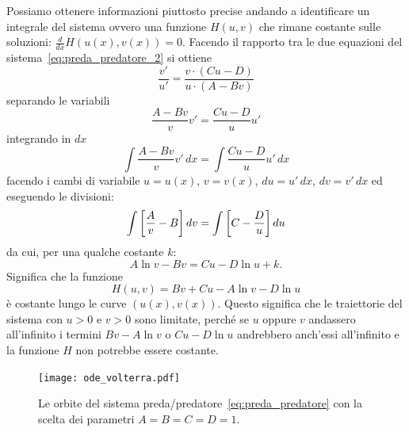 Possiamo ottenere informazioni piuttosto precise andando a identificare un integrale 
del sistema ovvero una funzione $H(u,v)$ che rimane costante sulle soluzioni: 
$\frac {d}{dx} H(u(x),v(x)) = 0$. 
Facendo il rapporto tra le due equazioni del sistema~\eqref{eq:preda_predatore_2}
si ottiene 
\[
  \frac{v'}{u'} 
  = \frac{v \cdot (C u - D)}{u \cdot (A - B v)}
\]
separando le variabili
\[
  \frac{A - B v}{v} v' = \frac{C u - D}{u} u'
\]
integrando in $dx$
\[
  \int \frac{A - B v}{v} v'\, dx  = \int \frac{C u - D}{u} u'  \, dx
\]
facendo i cambi di variabile $u=u(x)$, $v=v(x)$, $du = u'\, dx$, $dv=v'\, dx$
ed eseguendo le divisioni:
\[     
  \int {\left[ \frac A v - B \right]}\, dv = \int {\left[ C  - \frac D u \right]}\, du
\]
da cui, per una qualche costante $k$:
\[
  A \ln v - B v = C u - D\ln u + k.
\]
Significa che la funzione 
\[
  H(u,v) = B v + C u - A \ln v - D \ln u
\]
è costante lungo le curve $(u(x),v(x))$.
Questo significa che le traiettorie del sistema 
con $u>0$ e $v>0$ sono limitate, perché se 
$u$ oppure $v$ andassero all'infinito 
i termini $Bv-A\ln v$ o $Cu - D \ln u$ andrebbero 
anch'essi all'infinito e la funzione $H$ non 
potrebbe essere costante.

\begin{figure}
  \begin{center}
    \texttt{[image: ode\_volterra.pdf]}
  \end{center}
  \caption{
  Le orbite del sistema preda/predatore~\eqref{eq:preda_predatore} 
  con la scelta dei parametri $A=B=C=D=1$.}
  \label{fig:ode_volterra}
\end{figure}

